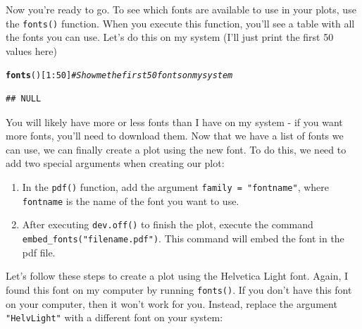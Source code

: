 \documentclass{tufte-book}\usepackage[]{graphicx}\usepackage[]{color}
\makeatletter
\newcommand{\hlnum}[1]{\textcolor[rgb]{0.686,0.059,0.569}{#1}}%
\newcommand{\hlcom}[1]{\textcolor[rgb]{0.678,0.584,0.686}{\textit{#1}}}%
\newcommand{\hlopt}[1]{\textcolor[rgb]{0,0,0}{#1}}%
\newcommand{\hlstd}[1]{\textcolor[rgb]{0.345,0.345,0.345}{#1}}%
\newcommand{\hlkwd}[1]{\textcolor[rgb]{0.737,0.353,0.396}{\textbf{#1}}}%
\newenvironment{kframe}{%
 \def\at@end@of@kframe{}%
 \ifinner\ifhmode%
  \def\at@end@of@kframe{\end{minipage}}%
  \begin{minipage}{\columnwidth}%
 \fi\fi%
 \def\FrameCommand##1{\hskip\@totalleftmargin \hskip-\fboxsep
 \colorbox{shadecolor}{##1}\hskip-\fboxsep
     \hskip-\linewidth \hskip-\@totalleftmargin \hskip\columnwidth}%
 \MakeFramed {\advance\hsize-\width
   \@totalleftmargin\z@ \linewidth\hsize
   \@setminipage}}%
 {\par\unskip\endMakeFramed%
 \at@end@of@kframe}
\newenvironment{knitrout}{}{} %
\makeatother
\begin{document}
Now you're ready to go. To see which fonts are available to use in your plots, use the \texttt{fonts()} function. When you execute this function, you'll see a table with all the fonts you can use. Let's do this on my system (I'll just print the first 50 values here)

\begin{tiny}
\begin{knitrout}
\color{fgcolor}\begin{kframe}
\begin{alltt}
\hlkwd{fonts}\hlstd{()[}\hlnum{1}\hlopt{:}\hlnum{50}\hlstd{]} \hlcom{# Show me the first 50 fonts on my system}
\end{alltt}
\begin{verbatim}
## NULL
\end{verbatim}
\end{kframe}
\end{knitrout}
\end{tiny}

You will likely have more or less fonts than I have on my system - if you want more fonts, you'll need to download them. Now that we have a list of fonts we can use, we can finally create a plot using the new font. To do this, we need to add two special arguments when creating our plot:

\begin{enumerate}
\item In the \texttt{pdf()} function, add the argument \texttt{family = "fontname"}, where \texttt{fontname} is the name of the font you want to use.
\item After executing \texttt{dev.off()} to finish the plot, execute the command \texttt{embed\_fonts("filename.pdf")}. This command will embed the font in the pdf file.
\end{enumerate}

Let's follow these steps to create a plot using the Helvetica Light font. Again, I found this font on my computer by running \texttt{fonts()}. If you don't have this font on your computer, then it won't work for you. Instead, replace the argument \texttt{"HelvLight"} with a different font on your system:
\end{document}
